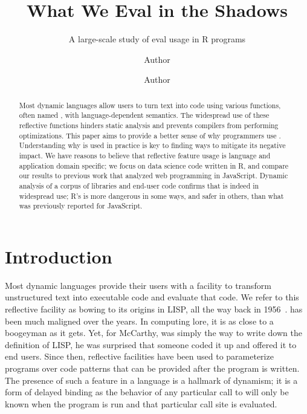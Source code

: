 \documentclass[screen,acmsmall]{acmart}
\begin{document}
\title{What We Eval in the Shadows}
\subtitle{A large-scale study of {\sf eval} usage in R programs}


\author{Author }
\orcid{}
\author{Author}
\authornotemark[1]

\begin{abstract}
  \noindent Most dynamic languages allow users to turn text into code
  using various functions, often named \eval, with language-dependent
  semantics. The widespread use of these reflective functions hinders
  static analysis and prevents compilers from performing
  optimizations. This paper aims to provide a better sense of why
  programmers use \eval. Understanding why \eval is used in practice
  is key to finding ways to mitigate its negative impact. We have
  reasons to believe that reflective feature usage is language and
  application domain specific; we focus on data science code written
  in R, and compare our results to previous work that analyzed web
  programming in JavaScript. Dynamic analysis of a corpus of
  \CranPackages libraries and \KaggleCode end-user code confirms that
  \eval is indeed in widespread use; R's \eval is more dangerous in
  some ways, and safer in others, than what was previously reported
  for JavaScript.
\end{abstract}

\maketitle

\section{Introduction}

Most dynamic languages provide their users with a facility to
transform unstructured text into executable code and evaluate that
code. We refer to this reflective facility as \eval bowing to its
origins in LISP, all the way back in 1956~\cite{lisp}. \Eval has been
much maligned over the years. In computing lore, it is as close to a
boogeyman as it gets. Yet, for McCarthy, \eval was simply the way to
write down the definition of LISP, he was surprised that someone coded
it up and offered it to end users. Since then, reflective facilities
have been used to parameterize programs over code patterns that can be
provided after the program is written. The presence of such a feature
in a language is a hallmark of dynamism; it is a form of delayed
binding as the behavior of any particular call to \eval will only be
known when the program is run and that particular call site is
evaluated.
\end{document}
